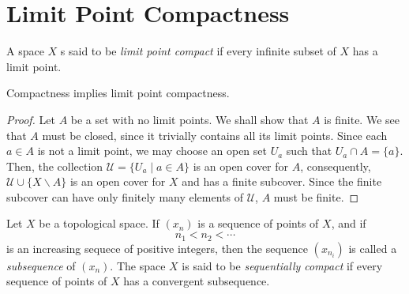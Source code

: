 \section{Limit Point Compactness}
\begin{definition}
    A space $X$ s said to be \textit{limit point compact} if every infinite subset of $X$ has a limit point.
\end{definition}

\begin{theorem}
    Compactness implies limit point compactness.
\end{theorem}
\begin{proof}
    Let $A$ be a set with no limit points. We shall show that $A$ is finite. We see that $A$ must be closed, since it trivially contains all its limit points. Since each $a\in A$ is not a limit point, we may choose an open set $U_a$ such that $U_a\cap A = \{a\}$. Then, the collection $\mathscr{U} = \{U_a\mid a\in A\}$ is an open cover for $A$, consequently, $\mathscr{U}\cup\{X\backslash A\}$ is an open cover for $X$ and has a finite subcover. Since the finite subcover can have only finitely many elements of $\mathscr{U}$, $A$ must be finite.
\end{proof}

\begin{definition}
    Let $X$ be a topological space. If $(x_n)$ is a sequence of points of $X$, and if 
    \begin{equation*}
        n_1 < n_2 < \cdots
    \end{equation*}
    is an increasing sequece of positive integers, then the sequence $(x_{n_i})$ is called a \textit{subsequence} of $(x_n)$. The space $X$ is said to be \textit{sequentially compact} if every sequence of points of $X$ has a convergent subsequence.
\end{definition}

